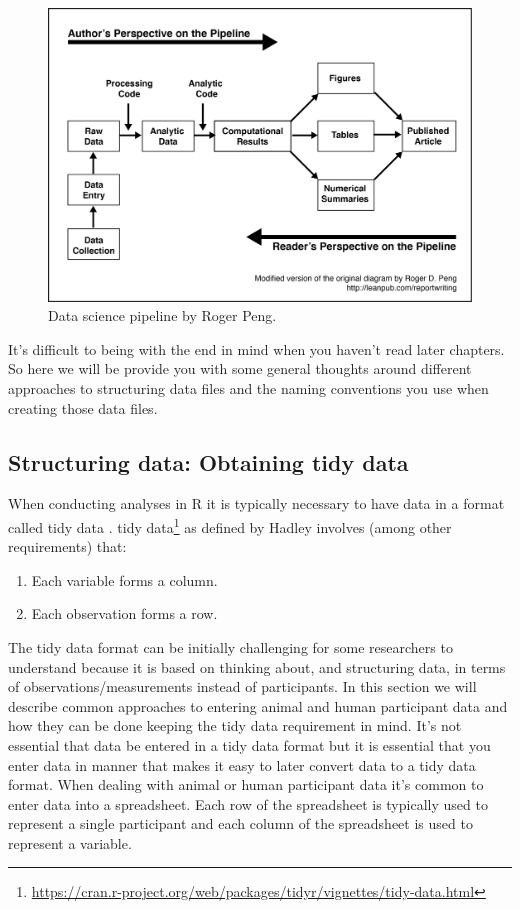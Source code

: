 \documentclass[
]{krantz}
\renewcommand{\href}[2]{#2\footnote{\url{#1}}}
\begin{document}
\begin{figure}
\includegraphics[width=0.85\linewidth]{ch_enter_load/images/pipeline} \caption{Data science pipeline by Roger Peng.}\label{fig:pipeline}
\end{figure}

It's difficult to being with the end in mind when you haven't read later chapters. So here we will be provide you with some general thoughts around different approaches to structuring data files and the naming conventions you use when creating those data files.

\hypertarget{structuring-data-obtaining-tidy-data}{%
\subsection{Structuring data: Obtaining tidy data}\label{structuring-data-obtaining-tidy-data}}

When conducting analyses in R it is typically necessary to have data in a format called tidy data \citep{tidy-data}. \href{https://cran.r-project.org/web/packages/tidyr/vignettes/tidy-data.html}{tidy data} as defined by Hadley involves (among other requirements) that:

\begin{enumerate}
\def\labelenumi{\arabic{enumi}.}
\item
  Each variable forms a column.
\item
  Each observation forms a row.
\end{enumerate}

The tidy data format can be initially challenging for some researchers to understand because it is based on thinking about, and structuring data, in terms of observations/measurements instead of participants. In this section we will describe common approaches to entering animal and human participant data and how they can be done keeping the tidy data requirement in mind. It's not essential that data be entered in a tidy data format but it is essential that you enter data in manner that makes it easy to later convert data to a tidy data format. When dealing with animal or human participant data it's common to enter data into a spreadsheet. Each row of the spreadsheet is typically used to represent a single participant and each column of the spreadsheet is used to represent a variable.
\end{document}
